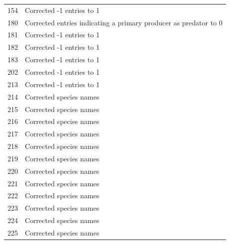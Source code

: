 \documentclass[12pt]{article}
\begin{document}
\begin{center}
\begin{table}[h!]
{\begin{tabular}{l | p{13cm}}
      154 & Corrected -1 entries to 1  \\
      180 &  Corrected entries indicating a primary producer as predator to 0 \\
      181 &  Corrected -1 entries to 1 \\
      182 &  Corrected -1 entries to 1 \\
      183 &  Corrected -1 entries to 1 \\
      202 &  Corrected -1 entries to 1  \\
      213 &  Corrected -1 entries to 1  \\
      214 &  Corrected species names \\
      215 &  Corrected species names \\
      216 &  Corrected species names \\
      217 &  Corrected species names \\
      218 &  Corrected species names \\
      219 &  Corrected species names \\
      220 &  Corrected species names \\
      221 &  Corrected species names \\
      222 &  Corrected species names \\
      223 &  Corrected species names \\
      224 &  Corrected species names \\
      225 &  Corrected species names \\
      \hline
      \end{tabular} }
      \end{table}


\end{center}
\end{document}
